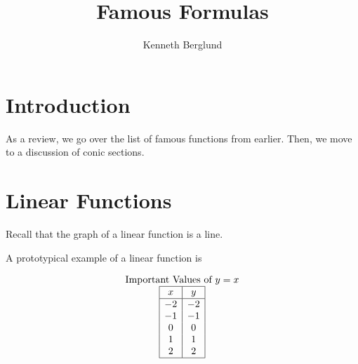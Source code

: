 \documentclass[nooutcomes]{ximera}
\author{Kenneth Berglund}
\title{Famous Formulas}
\begin{document}
\begin{abstract}
  
\end{abstract}
\maketitle

\section{Introduction}
As a review, we go over the list of famous functions from earlier. Then, we move to a discussion of conic sections. 


\section{Linear Functions}
Recall that the graph of a linear function is a line.
 
\begin{example}
A prototypical example of a linear function is
 
\begin{center}
\end{center}
 
\begin{center}
\end{center}
 
 
\[
\begin{array}{  c  }
\text{Important Values of $y=x$} \\
 \begin{array}{|c|c|}
 \hline
 x & y\\
 \hline
 -2&-2\\
 -1&-1\\
 0&0\\
 1&1\\
 2&2\\
 \hline
\end{array}
\end{array}
\]
 
\end{example}
 
\end{document}
